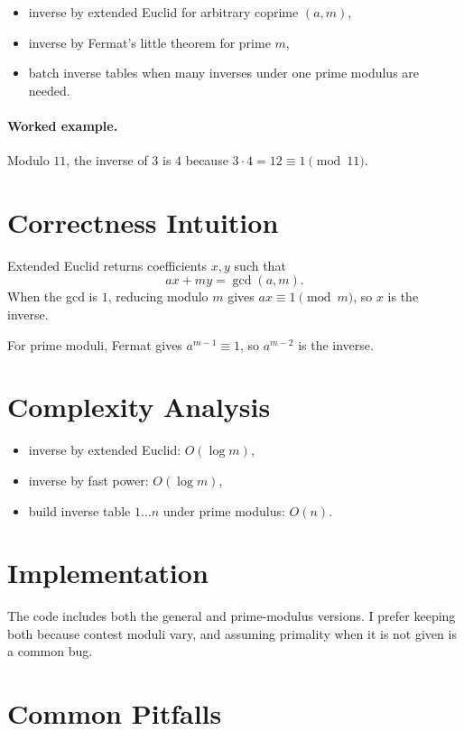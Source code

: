 \begin{itemize}
  \item inverse by extended Euclid for arbitrary coprime \((a, m)\),
  \item inverse by Fermat's little theorem for prime \(m\),
  \item batch inverse tables when many inverses under one prime modulus are needed.
\end{itemize}

\paragraph{Worked example.}
Modulo \(11\), the inverse of \(3\) is \(4\) because \(3 \cdot 4 = 12 \equiv 1 \pmod{11}\).

\section*{Correctness Intuition}

Extended Euclid returns coefficients \(x, y\) such that
\[
ax + my = \gcd(a, m).
\]
When the gcd is \(1\), reducing modulo \(m\) gives \(ax \equiv 1 \pmod m\), so \(x\) is the inverse.

For prime moduli, Fermat gives \(a^{m-1} \equiv 1\), so \(a^{m-2}\) is the inverse.

\section*{Complexity Analysis}

\begin{itemize}
  \item inverse by extended Euclid: \(O(\log m)\),
  \item inverse by fast power: \(O(\log m)\),
  \item build inverse table \(1 \ldots n\) under prime modulus: \(O(n)\).
\end{itemize}

\section*{Implementation}

The code includes both the general and prime-modulus versions. I prefer keeping both because contest moduli vary, and
assuming primality when it is not given is a common bug.

\section*{Common Pitfalls}

